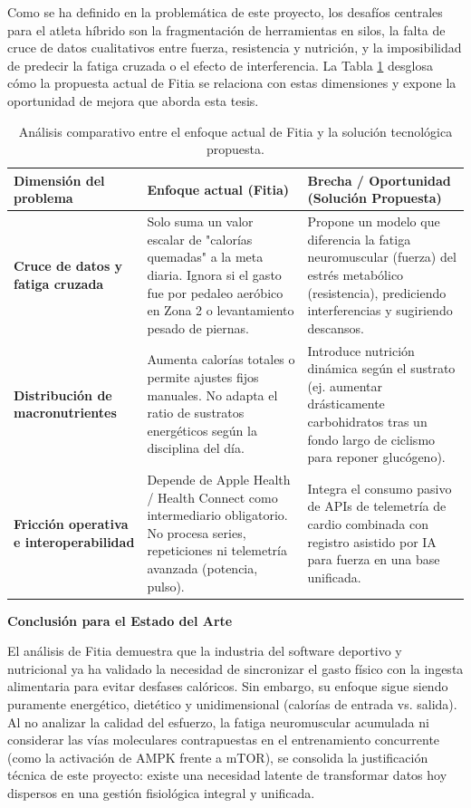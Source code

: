 \documentclass[12pt]{article}
\begin{document}
Como se ha definido en la problemática de este proyecto, los desafíos centrales para el atleta híbrido son la fragmentación de herramientas en silos, la falta de cruce de datos cualitativos entre fuerza, resistencia y nutrición, y la imposibilidad de predecir la fatiga cruzada o el efecto de interferencia. La Tabla \ref{tab:analisis_fitia} desglosa cómo la propuesta actual de Fitia se relaciona con estas dimensiones y expone la oportunidad de mejora que aborda esta tesis.
\newpage
\begin{table}[h!]
    \centering
    \renewcommand{\arraystretch}{1.5}
    \begin{tabular}{|m{4cm}|m{5cm}|m{6cm}|}
        \hline
        \rowcolor[HTML]{EFEFEF}
        \textbf{Dimensión del problema} & \textbf{Enfoque actual (Fitia)} & \textbf{Brecha / Oportunidad (Solución Propuesta)} \\ \hline
        \textbf{Cruce de datos y fatiga cruzada} & Solo suma un valor escalar de "calorías quemadas" a la meta diaria. Ignora si el gasto fue por pedaleo aeróbico en Zona 2 o levantamiento pesado de piernas. & Propone un modelo que diferencia la fatiga neuromuscular (fuerza) del estrés metabólico (resistencia), prediciendo interferencias y sugiriendo descansos. \\ \hline
        \textbf{Distribución de macronutrientes} & Aumenta calorías totales o permite ajustes fijos manuales. No adapta el ratio de sustratos energéticos según la disciplina del día. & Introduce nutrición dinámica según el sustrato (ej. aumentar drásticamente carbohidratos tras un fondo largo de ciclismo para reponer glucógeno). \\ \hline
        \textbf{Fricción operativa e interoperabilidad} & Depende de Apple Health / Health Connect como intermediario obligatorio. No procesa series, repeticiones ni telemetría avanzada (potencia, pulso). & Integra el consumo pasivo de APIs de telemetría de cardio combinada con registro asistido por IA para fuerza en una base unificada. \\ \hline
    \end{tabular}
    \caption{Análisis comparativo entre el enfoque actual de Fitia y la solución tecnológica propuesta.}
    \label{tab:analisis_fitia}
\end{table}

\textbf{Conclusión para el Estado del Arte}

El análisis de Fitia demuestra que la industria del software deportivo y nutricional ya ha validado la necesidad de sincronizar el gasto físico con la ingesta alimentaria para evitar desfases calóricos. Sin embargo, su enfoque sigue siendo puramente energético, dietético y unidimensional (calorías de entrada vs. salida). Al no analizar la calidad del esfuerzo, la fatiga neuromuscular acumulada ni considerar las vías moleculares contrapuestas en el entrenamiento concurrente (como la activación de AMPK frente a mTOR), se consolida la justificación técnica de este proyecto: existe una necesidad latente de transformar datos hoy dispersos en una gestión fisiológica integral y unificada.
\newpage
\end{document}
